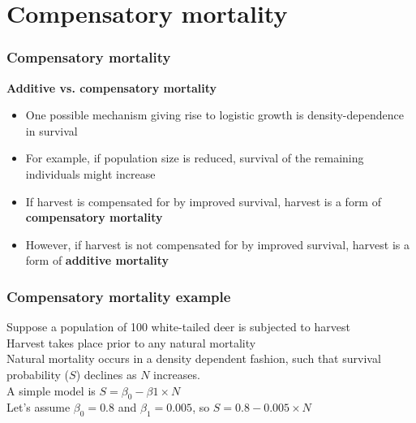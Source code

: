 \documentclass[color=usenames,dvipsnames]{beamer}\usepackage[]{graphicx}\usepackage[]{color}
\begin{document}
\section{Compensatory mortality}






\begin{frame}
  \frametitle{Compensatory mortality}
  \large
  {\bf Additive vs. compensatory mortality}
  \begin{itemize}[<+->]
    \item One possible mechanism giving rise to logistic growth is
      density-dependence in survival
    \item For example, if population size is reduced, survival of the
      remaining individuals might increase
    \item If harvest is compensated for by improved survival, harvest
      is a form of \alert{\bf compensatory mortality}
    \item However, if harvest is not compensated for by improved
      survival, harvest is a form of \alert{\bf additive mortality}
  \end{itemize}
  \vfill
\end{frame}



\begin{frame}
  \frametitle{Compensatory mortality example}
  \large
  Suppose a population of 100 white-tailed deer is subjected to
  harvest \\
  \pause \vfill
  Harvest takes place prior to any natural mortality \\
  \pause \vfill
  Natural mortality occurs in a density dependent fashion,
  such that survival probability ($S$) declines as $N$ increases. \\
  \pause \vfill
  A simple model is $S = \beta_0 - \beta1 \times N$ \\
  \pause \vfill
  Let's assume $\beta_0 = 0.8$ and $\beta_1 = 0.005$, so
  $S = 0.8 - 0.005 \times N$
\end{frame}
\end{document}
